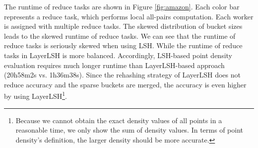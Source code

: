 The runtime of reduce tasks are shown in Figure \ref{fig:amazon}. Each color bar represents a reduce task, which performs local all-pairs computation. Each worker is assigned with multiple reduce tasks. The skewed distribution of bucket sizes leads to the skewed runtime of reduce tasks. We can see that the runtime of reduce tasks is seriously skewed when using LSH. While the runtime of reduce tasks in LayerLSH is more balanced. Accordingly, LSH-based point density evaluation requires much longer runtime than LayerLSH-based approach (20h58m2s vs. 1h36m38s). Since the rehashing strategy of LayerLSH does not reduce accuracy and the sparse buckets are merged, the accuracy is even higher by using LayerLSH\footnote{Because we cannot obtain the exact density values of all points in a reasonable time, we only show the sum of density values. In terms of point density's definition, the larger density should be more accurate.}.



